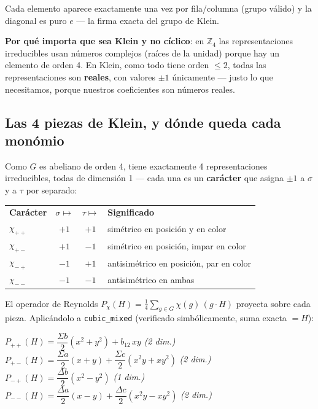 \documentclass[11pt, a4paper]{article}
\newcommand{\TH}[1]{\cellcolor{cTHbg}\color{white}\textbf{#1}}
\begin{document}
Cada elemento aparece exactamente una vez por fila/columna (grupo
v\'alido) y la diagonal es puro $e$ --- la firma exacta del grupo de
Klein.

\begin{tcolorbox}[quotebox]
  \textbf{Por qu\'e importa que sea Klein y no c\'iclico}: en
  $\mathbb{Z}_4$ las representaciones irreducibles usan n\'umeros
  complejos (ra\'ices de la unidad) porque hay un elemento de orden 4.
  En Klein, como todo tiene orden $\leq2$, todas las representaciones
  son \textbf{reales}, con valores $\pm1$ \'unicamente --- justo lo que
  necesitamos, porque nuestros coeficientes son n\'umeros reales.
\end{tcolorbox}

\subsection{Las 4 piezas de Klein, y d\'onde queda cada mon\'omio}

Como $G$ es abeliano de orden 4, tiene exactamente 4 representaciones
irreducibles, todas de dimensi\'on 1 --- cada una es un \textbf{car\'acter}
que asigna $\pm1$ a $\sigma$ y a $\tau$ por separado:

\medskip
\begin{center}
\begin{tabular}{lccl}
  \TH{Car\'acter} & \TH{$\sigma\mapsto$} & \TH{$\tau\mapsto$} & \TH{Significado} \\[1pt]
  $\chi_{++}$ & $+1$ & $+1$ & sim\'etrico en posici\'on y en color \\
  $\chi_{+-}$ & $+1$ & $-1$ & sim\'etrico en posici\'on, impar en color \\
  $\chi_{-+}$ & $-1$ & $+1$ & antisim\'etrico en posici\'on, par en color \\
  $\chi_{--}$ & $-1$ & $-1$ & antisim\'etrico en ambas \\
\end{tabular}
\end{center}
\medskip

El operador de Reynolds $P_\chi(H)=\frac{1}{4}\sum_{g\in G}\chi(g)\,(g{\cdot}H)$
proyecta sobre cada pieza. Aplic\'andolo a \texttt{cubic\_mixed}
(verificado simb\'olicamente, suma exacta $=H$):

\begin{tcolorbox}[codebox]
$P_{++}(H) = \dfrac{\Sigma b}{2}(x^2{+}y^2) + b_{12}\,xy$
\hfill \textit{(2 dim.)} \\[4pt]
$P_{+-}(H) = \dfrac{\Sigma a}{2}(x{+}y) + \dfrac{\Sigma c}{2}(x^2y{+}xy^2)$
\hfill \textit{(2 dim.)} \\[4pt]
$P_{-+}(H) = \dfrac{\Delta b}{2}(x^2{-}y^2)$
\hfill \textit{(1 dim.)} \\[4pt]
$P_{--}(H) = \dfrac{\Delta a}{2}(x{-}y) + \dfrac{\Delta c}{2}(x^2y{-}xy^2)$
\hfill \textit{(2 dim.)}
\end{tcolorbox}
\end{document}
